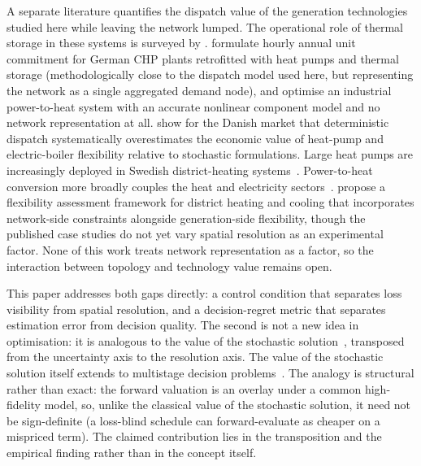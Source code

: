 A separate literature quantifies the dispatch value of the generation technologies
studied here while leaving the network lumped. The operational role of thermal storage in
these systems is surveyed by \citet{Guelpa2019review}. \citet{Mollenhauer2018} formulate hourly
annual unit commitment for German CHP plants retrofitted with heat pumps and thermal
storage (methodologically close to the dispatch model used here, but representing the
network as a single aggregated demand node), and \citet{Walden2023} optimise an
industrial power-to-heat system with an accurate nonlinear component model and no network
representation at all. \citet{Nielsen2016} show for the Danish market that deterministic
dispatch systematically overestimates the economic value of heat-pump and electric-boiler
flexibility relative to stochastic formulations. Large heat pumps are increasingly deployed
in Swedish district-heating systems~\citep{Averfalk2017}. Power-to-heat conversion more
broadly couples the heat and electricity sectors~\citep{Schweiger2017_p2h}. \citet{Riedl2026} propose a flexibility
assessment framework for district heating and cooling that incorporates network-side
constraints alongside generation-side flexibility, though the published case studies do
not yet vary spatial resolution as an experimental factor. None of this work treats
network representation as a factor, so the interaction between topology and technology
value remains open.

This paper addresses both gaps directly: a control condition that separates loss
visibility from spatial resolution, and a decision-regret metric that separates
estimation error from decision quality. The second is not a new idea in optimisation:
it is analogous to the value of the stochastic solution~\citep{BirgeLouveaux2011}, transposed
from the uncertainty axis to the resolution axis. The value of the stochastic solution itself
extends to multistage decision problems~\citep{Escudero2007VSS}. The analogy is structural rather than exact:
the forward valuation is an overlay under a common high-fidelity model, so, unlike the classical
value of the stochastic solution, it need not be sign-definite (a loss-blind schedule can
forward-evaluate as cheaper on a mispriced term). The claimed contribution lies in the
transposition and the empirical finding rather than in the concept itself.
